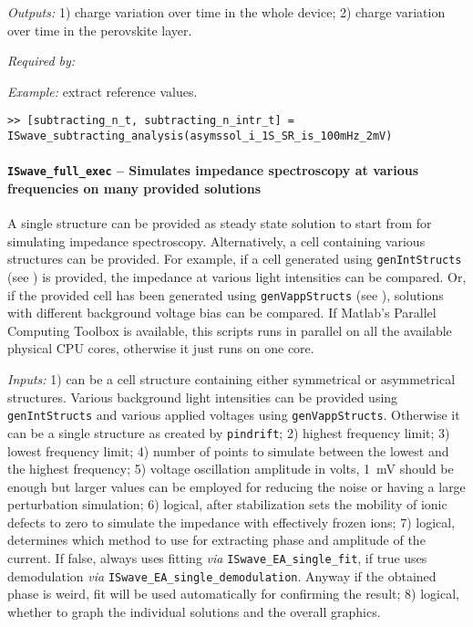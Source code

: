\textit{Outputs:} 1) charge variation over time in the whole device;
2) charge variation over time in the perovskite layer.


\textit{Required by:} 

\textit{Example:} extract reference values.
\begin{lstlisting}[style=Matlab-editor]
>> [subtracting_n_t, subtracting_n_intr_t] = ISwave_subtracting_analysis(asymssol_i_1S_SR_is_100mHz_2mV)
\end{lstlisting}

\paragraph{\texttt{ISwave\_full\_exec} -- Simulates impedance spectroscopy at various frequencies on many provided solutions}
A single structure can be provided as steady state solution to start from for simulating impedance spectroscopy.
Alternatively, a cell containing various structures can be provided.
For example, if a cell generated using \texttt{gen\-Int\-Structs} (see ) is provided, the impedance at various light intensities can be compared.
Or, if the provided cell has been generated using \texttt{gen\-Vapp\-Structs} (see ), solutions with different background voltage bias can be compared.
If Matlab's Parallel Computing Toolbox is available, this scripts runs in parallel on all the available physical CPU cores, otherwise it just runs on one core.

\textit{Inputs:} 1) can be a cell structure containing either symmetrical or asymmetrical structures. Various background
light intensities can be provided using \texttt{gen\-Int\-Structs} and various applied voltages using \texttt{gen\-Vapp\-Structs}.
     Otherwise it can be a single structure as created by \texttt{pindrift};
   2) highest frequency limit;
   3) lowest frequency limit;
   4) number of points to simulate between the lowest and
     the highest frequency;
   5) voltage oscillation amplitude in volts, \SI{1}{\mV} should be enough but larger values can be employed for reducing the noise or having a large perturbation simulation;
   6) logical, after stabilization sets the mobility of
     ionic defects to zero to simulate the impedance with effectively frozen ions;
   7) logical, determines which method to use for extracting phase and amplitude of the current.
    If false, always uses fitting \textsl{via} \texttt{ISwave\_EA\_single\_fit}, if true uses demodulation \textsl{via} \texttt{ISwave\_EA\_single\_demodulation}. Anyway if the obtained phase is weird, fit will be used
     automatically for confirming the result;
   8) logical, whether to graph the individual solutions and
     the overall graphics.

